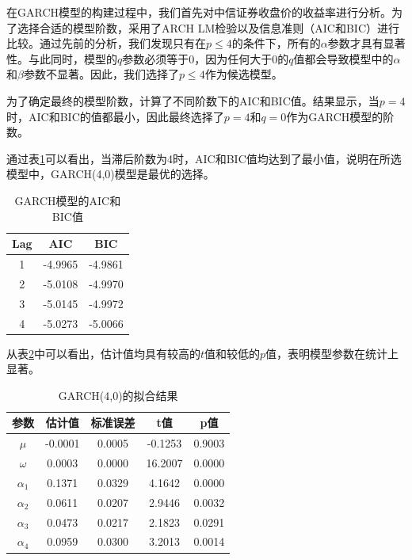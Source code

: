 \documentclass[12pt]{article}
\begin{document}
在GARCH模型的构建过程中，我们首先对中信证券收盘价的收益率进行分析。为了选择合适的模型阶数，采用了ARCH LM检验以及信息准则（AIC和BIC）进行比较。通过先前的分析，我们发现只有在$p\leq 4$的条件下，所有的$\alpha$参数才具有显著性。与此同时，模型的$q$参数必须等于0，因为任何大于0的$q$值都会导致模型中的$\alpha$和$\beta$参数不显著。因此，我们选择了$p\leq 4$作为候选模型。

为了确定最终的模型阶数，计算了不同阶数下的AIC和BIC值。结果显示，当$p=4$时，AIC和BIC的值都最小，因此最终选择了$p=4$和$q=0$作为GARCH模型的阶数。

通过表\ref{tab:AICBIC}可以看出，当滞后阶数为4时，AIC和BIC值均达到了最小值，说明在所选模型中，GARCH(4,0)模型是最优的选择。

\begin{table}[H]
    \centering
    \caption{GARCH模型的AIC和BIC值}
    \label{tab:AICBIC}
    \begin{tabular}{ccc}
        \toprule
        Lag & AIC & BIC \\ 
        \midrule
        1 & -4.9965 & -4.9861\\
        2 & -5.0108 & -4.9970\\
        3 & -5.0145 & -4.9972\\
        4 &	-5.0273 & -5.0066\\
        \bottomrule
    \end{tabular}
\end{table}

从表\ref{tab:GARCH40}中可以看出，估计值均具有较高的$t$值和较低的$p$值，表明模型参数在统计上显著。

\begin{table}[H]
    \centering
    \caption{GARCH(4,0)的拟合结果}
    \label{tab:GARCH40}
    \begin{tabular}{ccccc}
        \toprule
        参数 & 估计值 & 标准误差 & t值 & p值 \\ 
        \midrule
        $\mu$ & -0.0001 & 0.0005 & -0.1253 & 0.9003\\
        $\omega$ & 0.0003 &	0.0000 & 16.2007 & 0.0000\\
        $\alpha_{1}$ & 0.1371 & 0.0329 & 4.1642	& 0.0000\\
        $\alpha_{2}$ & 0.0611 &	0.0207 & 2.9446	& 0.0032\\
        $\alpha_{3}$ & 0.0473 &	0.0217 & 2.1823	& 0.0291\\
        $\alpha_{4}$ & 0.0959 &	0.0300 & 3.2013	& 0.0014\\
        \bottomrule
    \end{tabular}
\end{table}
\end{document}
